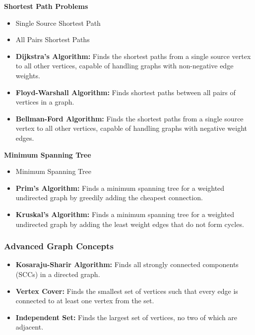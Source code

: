 \documentclass[landscape,7pt]{extarticle}
\begin{document}
\begin{multicols*}{3}
\textbf{Shortest Path Problems}

\begin{itemize}
    \item Single Source Shortest Path
    \item All Pairs Shortest Paths
\end{itemize}


\begin{itemize}
    \item \textbf{Dijkstra's Algorithm:} Finds the shortest paths from a single source vertex to all other vertices, capable of handling graphs with non-negative edge weights.
    \item \textbf{Floyd-Warshall Algorithm:} Finds shortest paths between all pairs of vertices in a graph.
    \item \textbf{Bellman-Ford Algorithm:} Finds the shortest paths from a single source vertex to all other vertices, capable of handling graphs with negative weight edges.
\end{itemize}

\textbf{Minimum Spanning Tree}

\begin{itemize}
    \item Minimum Spanning Tree
\end{itemize}


\begin{itemize}
    \item \textbf{Prim's Algorithm:} Finds a minimum spanning tree for a weighted undirected graph by greedily adding the cheapest connection.
    \item \textbf{Kruskal's Algorithm:} Finds a minimum spanning tree for a weighted undirected graph by adding the least weight edges that do not form cycles.
\end{itemize}

\subsubsection*{Advanced Graph Concepts}

\begin{itemize}
    \item \textbf{Kosaraju-Sharir Algorithm:} Finds all strongly connected components (SCCs) in a directed graph.
    \item \textbf{Vertex Cover:} Finds the smallest set of vertices such that every edge is connected to at least one vertex from the set.
    \item \textbf{Independent Set:} Finds the largest set of vertices, no two of which are adjacent.
\end{itemize}


\end{multicols*}
\end{document}
